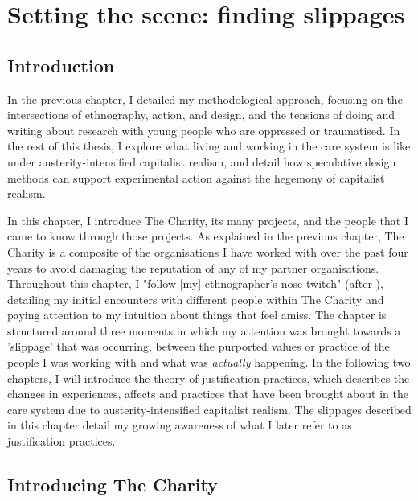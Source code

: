 \chapter{Setting the scene: finding slippages}
\label{4}

\section{Introduction}
\label{4-intro}

In the previous chapter, I detailed my methodological approach, focusing on the intersections of ethnography, action, and design, and the tensions of doing and writing about research with young people who are oppressed or traumatised. In the rest of this thesis, I explore what living and working in the care system is like under austerity-intensified capitalist realism, and detail how speculative design methods can support experimental action against the hegemony of capitalist realism. 

In this chapter, I introduce The Charity, its many projects, and the people that I came to know through those projects. As explained in the previous chapter, The Charity is a composite of the organisations I have worked with over the past four years to avoid damaging the reputation of any of my partner organisations. Throughout this chapter, I "follow [my] ethnographer’s nose twitch" (after \cite{leigh_star_this_2010}), detailing my initial encounters with different people within The Charity and paying attention to my intuition about things that feel amiss. The chapter is structured around three moments in which my attention was brought towards a 'slippage' \citep{cutting_making_2021} that was occurring, between the purported values or practice of the people I was working with and what was \textit{actually} happening. In the following two chapters, I will introduce the theory of justification practices, which describes the changes in experiences, affects and practices that have been brought about in the care system due to austerity-intensified capitalist realism. The slippages described in this chapter detail my growing awareness of what I later refer to as justification practices.

\section{Introducing The Charity}

